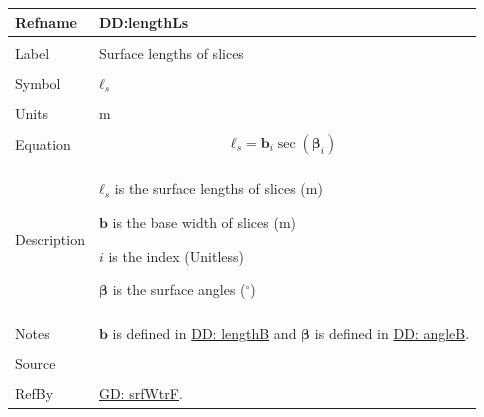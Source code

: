 \documentclass[12pt]{article}
\begin{document}
\noindent \begin{minipage}{\textwidth}
\begin{tabular}{p{} p{}}
\toprule \textbf{Refname} & \textbf{DD:lengthLs}
\label{DD:lengthLs}
\\ \midrule \\
Label & Surface lengths of slices
\\ \midrule \\
Symbol & ${\mathbf{ℓ}_{s}}$
\\ \midrule \\
Units & m
\\ \midrule \\
Equation & \begin{displaymath}
           {\mathbf{ℓ}_{s}}={\mathbf{b}}_{i} \sec\left({\mathbf{β}}_{i}\right)
           \end{displaymath}
\\ \midrule \\
Description & \begin{symbDescription}
              \item{${\mathbf{ℓ}_{s}}$ is the surface lengths of slices (m)}
              \item{$\mathbf{b}$ is the base width of slices (m)}
              \item{$i$ is the index (Unitless)}
              \item{$\mathbf{β}$ is the surface angles (${}^{\circ}$)}
              \end{symbDescription}
\\ \midrule \\
Notes & $\mathbf{b}$ is defined in \hyperref[DD:lengthB]{DD: lengthB} and $\mathbf{β}$ is defined in \hyperref[DD:angleB]{DD: angleB}.
\\ \midrule \\
Source & \cite{fredlund1977}
\\ \midrule \\
RefBy & \hyperref[GD:srfWtrF]{GD: srfWtrF}.
\\ \bottomrule \end{tabular}
\end{minipage}
\par~
\end{document}
